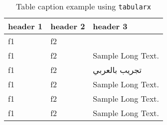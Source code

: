 \begin{table}[t!]
	\centering
		\caption{Table caption example using \texttt{tabularx}}\label{table2}
	\begin{tabularx}{\textwidth}{llX}
		\toprule
		header 1 & header 2 & header 3 \\
		\midrule
		f1 & f2& \lipsum[1]\\
		f1 & f2& Sample Long Text. \\
		f1 & f2& \textarabic{تجريب بالعربي}\\
		f1 & f2&Sample Long Text.\\
		f1 & f2& Sample Long Text.\\
		f1 & f2& Sample Long Text.\\
		\bottomrule
	\end{tabularx}

\end{table}

\lipsum[1]
